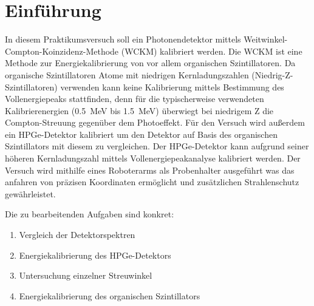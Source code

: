 \section{Einführung}
In diesem Praktikumsversuch soll ein Photonendetektor mittels Weitwinkel-Compton-Koinzidenz-Methode (WCKM) kalibriert werden.
Die WCKM ist eine Methode zur Energiekalibrierung von vor allem organischen Szintillatoren. Da organische Szintillatoren Atome mit niedrigen Kernladungszahlen (Niedrig-Z-Szintillatoren) verwenden kann keine Kalibrierung mittels Bestimmung des Vollenergiepeaks stattfinden, denn für die typischerweise verwendeten Kalibrierenergien (\SI{0.5}{\mega\electronvolt} bis \SI{1.5}{\mega\electronvolt}) überwiegt bei niedrigem Z die Compton-Streuung gegenüber dem Photoeffekt.
Für den Versuch wird außerdem ein HPGe-Detektor kalibriert um den Detektor auf Basis des organischen Szintillators mit diesem zu vergleichen. Der HPGe-Detektor kann aufgrund seiner höheren Kernladungszahl mittels Vollenergiepeakanalyse kalibriert werden.
Der Versuch wird mithilfe eines Roboterarms als Probenhalter ausgeführt was das anfahren von präzisen Koordinaten ermöglicht und zusätzlichen Strahlenschutz gewährleistet.

Die zu bearbeitenden Aufgaben sind konkret:
\begin{enumerate}
    \item Vergleich der Detektorspektren
    \item Energiekalibrierung des HPGe-Detektors
    \item Untersuchung einzelner Streuwinkel
    \item Energiekalibrierung des organischen Szintillators
\end{enumerate}
